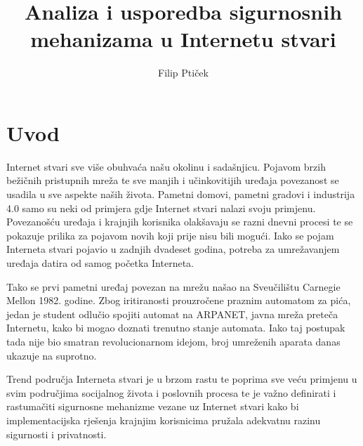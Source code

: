 \documentclass[times, utf8, diplomski]{fer}
\begin{document}

\title{Analiza i usporedba sigurnosnih mehanizama u Internetu stvari}

\author{Filip Ptiček}

\maketitle




\tableofcontents

\chapter{Uvod}
Internet stvari sve više obuhvaća našu okolinu i sadašnjicu. Pojavom brzih bežičnih pristupnih mreža te sve manjih i učinkovitijih uređaja povezanost se usadila u sve aspekte naših života. Pametni domovi, pametni gradovi i industrija 4.0 samo su neki od primjera gdje Internet stvari nalazi svoju primjenu. Povezanošću uređaja i krajnjih korisnika olakšavaju se razni dnevni procesi te se pokazuje prilika za pojavom novih koji prije nisu bili mogući. Iako se pojam Interneta stvari pojavio u zadnjih dvadeset godina, potreba za umrežavanjem uređaja datira od samog početka Interneta. 

Tako se prvi pametni uređaj povezan na mrežu našao na Sveučilištu Carnegie Mellon 1982. godine. Zbog iritiranosti prouzročene praznim automatom za pića, jedan je student odlučio spojiti automat na ARPANET, javna mreža preteča Internetu, kako bi mogao doznati trenutno stanje automata\citep{Coke}. Iako taj postupak tada nije bio smatran revolucionarnom idejom, broj umreženih aparata danas ukazuje na suprotno.

Trend područja Interneta stvari je u brzom rastu te poprima sve veću primjenu u svim područjima socijalnog života i poslovnih procesa te je važno definirati i rastumačiti sigurnosne mehanizme vezane uz Internet stvari kako bi implementacijska rješenja krajnjim korisnicima pružala adekvatnu razinu sigurnosti i privatnosti.
\end{document}
